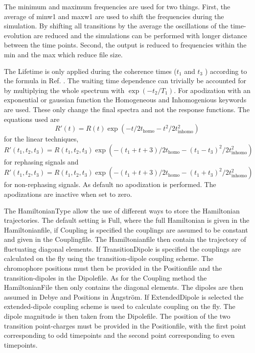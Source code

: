 The minimum and maximum frequencies are used for two things. First, the average of minw1 and maxw1 are used to shift the frequencies during the simulation. By shifting all transitions by the
average the oscillations of the time-evolution are reduced and the simulations can be performed with
longer distance between the time points. Second, the output is reduced to frequencies within the
min and the max which reduce file size.

The Lifetime is only applied during the coherence times ($t_1$ and $t_3$ ) according 
to the formula in Ref. . The waiting time dependence can trivially be accounted for by 
multiplying the whole spectrum with $\exp( -t_2 /T_1 )$. For apodization with an exponential or gaussian function the Homogeneous and Inhomogenious keywords are used. These only change the final spectra and not the response functions. The equations used are
\begin{equation}
R'(t)=R(t)\exp\left(-t/2 t_{\textrm{homo}}-t^2/2 t_{\textrm{inhomo}}^2\right)
\end{equation}
for the linear techniques,
\begin{equation}
R'(t_1,t_2,t_3)=R(t_1,t_2,t_3)\exp\left(-(t_1+t+3)/2 t_{\textrm{homo}}-(t_1-t_3)^2/2 t_{\textrm{inhomo}}^2\right)
\end{equation}
for rephasing signals and
\begin{equation}
R'(t_1,t_2,t_3)=R(t_1,t_2,t_3)
\exp\left(-(t_1+t+3)/2 t_{\textrm{homo}}-(t_1+t_3)^2/2 t_{\textrm{inhomo}}^2\right)
\end{equation}
for non-rephasing signals. As default no apodization is performed. The apodizations are inactive when set to zero.  

The HamiltonianType allow the use of different ways to store the Hamiltonian trajectories. The default setting is Full, where the full Hamiltonian is given in the Hamiltonianfile, if Coupling is specified the couplings are assumed to be constant and given in the Couplingfile. The Hamiltonianfile then contain the trajectory of fluctuating diagonal elements. If TransitionDipole is specified the couplings are calculated on the fly using the transition-dipole coupling scheme. The chromophore positions must then be provided in the Positionfile and the transition-dipoles in the Dipolefile. As for the Coupling method the HamiltonianFile then only contains the diagonal elements. The dipoles are then assumed in Debye and Positions in \AA ngstr\"{o}m. If ExtendedDipole is selected the extended-dipole coupling scheme is used to calculate coupling on the fly. The dipole magnitude is then taken from the Dipolefile. The position of the two transition point-charges must be provided in the Positionfile, with the first point corresponding to odd timepoints and the second point corresponding to even timepoints.

